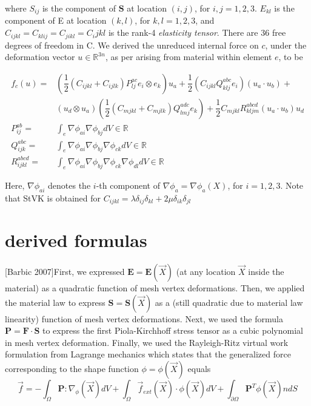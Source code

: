 \documentclass[10pt,a4paper]{article}
\begin{document}
where $ S_{ij} $ is the component of $ \mathbf{S} $ at location $ (i,j) $, for $ i,j = 1,2,3 $. $ E_{kl} $ is the component of E at location $ (k,l) $, for $ k,l=1,2,3 $, and $ C_{ijkl} = C_{klij} = C_{jikl} = C_ijkl $ is the rank-4 \textit{elasticity tensor}. There are \num{36} free degrees of freedom in C. We derived the unreduced internal force on $ c $, under the deformation vector $ u \in \mathbb{R}^{3n} $, as per arising from material within element $ e $, to be

\begin{align}
f_c(u) = &\left( \dfrac{1}{2} \left( C_{ijkl} + C_{ijlk}\right) P_{lj}^{ac} e_i \otimes e_k\right) u_a + \dfrac{1}{2} \left( C_{ijkl} Q_{klj}^{abc} e_i\right) (u_a \cdot u_b) + \\
 &(u_d \otimes u_a)\left( \dfrac{1}{2}(C_{mjkl}+C_{mjlk}) Q_{lmj}^{adc} e_k\right) + \dfrac{1}{2} C_{mjkl} R_{kljm}^{abcd}(u_a \cdot u_b)u_d \\
 P_{ij}^{ab} = &\int_{e}\nabla \phi_{ai} \nabla \phi_{bj} dV \in \mathbb{R} \\
 Q_{ijk}^{abc} = &\int_{e} \nabla \phi_{ai} \nabla \phi_{bj} \nabla \phi_{ck} dV \in \mathbb{R} \\
 R_{ijkl}^{abcd} = & \int_{e} \nabla \phi_{ai} \nabla\phi_{bj} \nabla\phi_{ck} \nabla\phi_{dl}dV \in \mathbb{R}
\end{align}

Here, $ \nabla\phi_{ai} $ denotes the $ i $-th component of $ \nabla\phi_a = \nabla \phi_a(X) $, for $ i=1,2,3 $. Note that StVK is obtained for $ C_{ijkl} = \lambda \delta_{ij} \delta_{kl} + 2\mu \delta_{ik} \delta_{jl} $

\section{derived formulas} 
[Barbic 2007]First, we expressed $ \mathbf{E} = \mathbf{E}(\vec{X}) $ (at any location $ \vec{X} $ inside the material) as a quadratic function of mesh vertex deformations. Then, we applied the material law to express $ \mathbf{S} = \mathbf{S}(\vec{X}) $ as a (still quadratic due to material law linearity) function of mesh vertex deformations. Next, we used the formula $ \mathbf{P} = \mathbf{F} \cdot \mathbf{S} $ to express the first Piola-Kirchhoff stress tensor as a cubic polynomial in mesh vertex deformation. Finally, we used the Rayleigh-Ritz virtual work formulation from Lagrange mechanics which states that the generalized force corresponding to the shape function $ \phi = \phi(\vec{X}) $ equals
\begin{equation}
\vec{f} = - \int_{\Omega} \mathbf{P}:\nabla_\phi (\vec{X}) dV + \int_{\Omega}\vec{f}_{ext}(\vec{X}) \cdot \phi(\vec{X}) dV + \int_{\partial \Omega} \mathbf{P}^T\phi(\vec{X})ndS
\end{equation}
\end{document}
